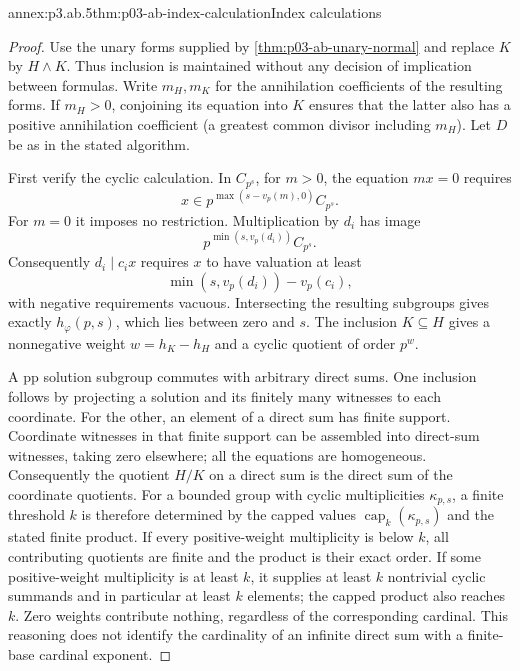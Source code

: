 \begin{annexitem}{annex:p3.ab.5}{thm:p03-ab-index-calculation}{Index calculations}
\begin{proof}
Use the unary forms supplied by \cref{thm:p03-ab-unary-normal} and
replace \(K\) by \(H\land K\). Thus inclusion is maintained without
any decision of implication between formulas. Write \(m_H,m_K\) for
the annihilation coefficients of the resulting forms. If \(m_H>0\),
conjoining its equation into \(K\) ensures that the latter also has a
positive annihilation coefficient (a greatest common divisor including
\(m_H\)). Let \(D\) be as in the stated algorithm.

First verify the cyclic calculation. In \(C_{p^s}\), for \(m>0\),
the equation \(mx=0\) requires
\[
 x\in p^{\max(s-v_p(m),0)}C_{p^s}.
\]
For \(m=0\) it imposes no restriction. Multiplication by \(d_i\) has image
\[
 p^{\min(s,v_p(d_i))}C_{p^s}.
\]
Consequently \(d_i\mid c_ix\) requires \(x\) to have valuation at least
\[
 \min(s,v_p(d_i))-v_p(c_i),
\]
with negative requirements vacuous. Intersecting the resulting subgroups
gives exactly \(h_\varphi(p,s)\), which lies between zero and \(s\).
The inclusion \(K\subseteq H\) gives a nonnegative weight \(w=h_K-h_H\)
and a cyclic quotient of order \(p^w\).

A pp solution subgroup commutes with arbitrary direct sums. One
inclusion follows by projecting a solution and its finitely many
witnesses to each coordinate. For the other, an element of a direct
sum has finite support. Coordinate witnesses in that finite support
can be assembled into direct-sum witnesses, taking zero elsewhere;
all the equations are homogeneous. Consequently the quotient \(H/K\)
on a direct sum is the direct sum of the coordinate quotients.
For a bounded group with cyclic multiplicities \(\kappa_{p,s}\), a
finite threshold \(k\) is therefore determined by the capped values
\(\operatorname{cap}_k(\kappa_{p,s})\) and the stated finite product.
If every positive-weight multiplicity is below \(k\), all contributing
quotients are finite and the product is their exact order. If some
positive-weight multiplicity is at least \(k\), it supplies at least
\(k\) nontrivial cyclic summands and in particular at least \(k\)
elements; the capped product also reaches \(k\). Zero weights contribute
nothing, regardless of the corresponding cardinal. This reasoning does
not identify the cardinality of an infinite direct sum with a finite-base
cardinal exponent.


\end{proof}
\end{annexitem}
